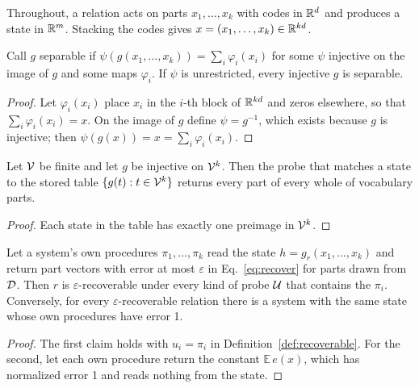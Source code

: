 
Throughout, a relation acts on parts $x_1, \ldots, x_k$ with codes in $\mathbb{R}^d$ and produces a state in $\mathbb{R}^m$. Stacking the codes gives $x = (x_1, \ldots, x_k) \in \mathbb{R}^{kd}$.



\begin{lemma}
\label{lem:psi}
Call $g$ separable if $\psi(g(x_1, \ldots, x_k)) = \sum_i \varphi_i(x_i)$ for some $\psi$ injective on the image of $g$ and some maps $\varphi_i$. If $\psi$ is unrestricted, every injective $g$ is separable.
\end{lemma}

\begin{proof}
Let $\varphi_i(x_i)$ place $x_i$ in the $i$-th block of $\mathbb{R}^{kd}$ and zeros elsewhere, so that $\sum_i \varphi_i(x_i) = x$. On the image of $g$ define $\psi = g^{-1}$, which exists because $g$ is injective; then $\psi(g(x)) = x = \sum_i \varphi_i(x_i)$.
\end{proof}

\noindent

\begin{lemma}
\label{lem:lookup}
Let $\mathcal{V}$ be finite and let $g$ be injective on $\mathcal{V}^k$. Then the probe that matches a state to the stored table $\{g(t) : t \in \mathcal{V}^k\}$ returns every part of every whole of vocabulary parts.
\end{lemma}

\begin{proof}
Each state in the table has exactly one preimage in $\mathcal{V}^k$.
\end{proof}

\noindent



\begin{observation}
\label{prop:subset}
Let a system's own procedures $\pi_1, \ldots, \pi_k$ read the state $h = g_r(x_1, \ldots, x_k)$ and return part vectors with error at most $\varepsilon$ in Eq.~\eqref{eq:recover} for parts drawn from $\mathcal{D}$. Then $r$ is $\varepsilon$-recoverable under every kind of probe $\mathcal{U}$ that contains the $\pi_i$. Conversely, for every $\varepsilon$-recoverable relation there is a system with the same state whose own procedures have error 1.
\end{observation}

\begin{proof}
The first claim holds with $u_i = \pi_i$ in Definition~\ref{def:recoverable}. For the second, let each own procedure return the constant $\mathbb{E}\,e(x)$, which has normalized error 1 and reads nothing from the state.
\end{proof}

